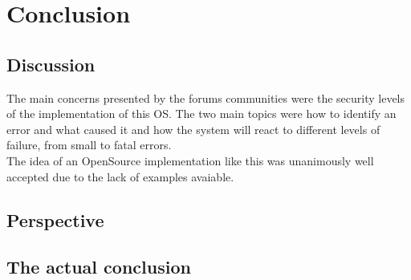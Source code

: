 \chapter{Conclusion}\label{ch:conclusion}

\section{Discussion}
The main concerns presented by the forums communities were the security levels of the implementation of this 
OS. The two main topics were how to identify an error and what caused it and how the system will react to
 different levels of failure, from small to fatal errors.\\
The idea of an OpenSource implementation like this was unanimously well accepted due to the lack of examples
avaiable.

\section{Perspective}

\section{The actual conclusion}

